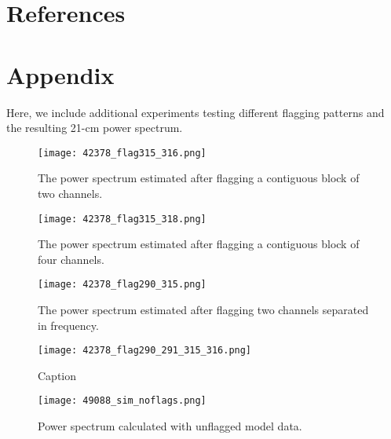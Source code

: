 \documentclass[12pt]{article}
\begin{document}
\tocless\section{\hypertarget{references}{References}}



\newpage
\tocless\section{\hypertarget{appendix}{Appendix}}

Here, we include additional experiments testing different flagging patterns and the resulting 21-cm power spectrum.

\begin{figure}[th]
	\centering
	\texttt{[image: 42378\_flag315\_316.png]}
	\caption[Power spectrum calculated with flagged time integrations and two contiguous flagged channels]{The power spectrum estimated after flagging a contiguous block of two channels.}
	\label{fig:flag_chan315_316}
\end{figure}

\begin{figure}[p]
	\centering
	\texttt{[image: 42378\_flag315\_318.png]}
	\caption[Power spectrum calculated with flagged time integrations and four contiguous flagged channels]{The power spectrum estimated after flagging a contiguous block of four channels.}
	\label{fig:flag_chan315_318}
\end{figure}

\begin{figure}[p]
	\centering
	\texttt{[image: 42378\_flag290\_315.png]}
	\caption[Power spectrum calculated with flagged time integrations and two non-contiguous flagged channels]{The power spectrum estimated after flagging two channels separated in frequency.}
	\label{fig:flag_chan290_315}
\end{figure}

\begin{figure}[p]
	\centering
	\texttt{[image: 42378\_flag290\_291\_315\_316.png]}
	\caption[Power spectrum calculated with flagged time integrations and four flagged channels (two blocks of two channels)]{Caption}
	\label{fig:flag_chan290_291_315_316}
\end{figure}

\begin{figure}[p]
	\centering
	\texttt{[image: 49088\_sim\_noflags.png]}
	\caption[Original model power spectrum (only foregrounds)]{Power spectrum calculated with unflagged model data.}
	\label{fig:sim_noflags}
\end{figure}
\end{document}
